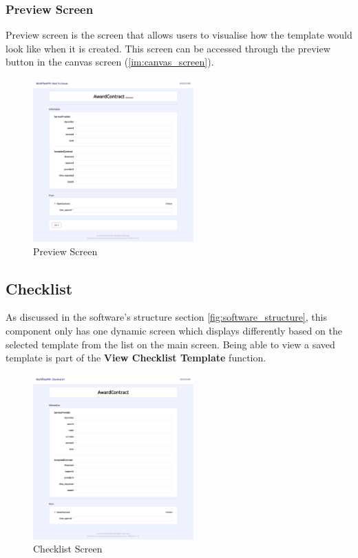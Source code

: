 \subsubsection{Preview Screen}
\label{im:preview_screen}

Preview screen is the screen that allows users to visualise how the template would look like when it is created. This screen can be accessed through the preview button in the canvas screen (\ref{im:canvas_screen}).

\begin{figure}[ht!]
    \centering
    \includegraphics[width=0.55\textwidth]{overleaf/images/screens/preview_screen.png}
    \caption{Preview Screen}
    \label{fig:preview_screen}
\end{figure}





\subsection{Checklist}
\label{im:view_checklist}

As discussed in the software's structure section \ref{fig:software_structure}, this component only has one dynamic screen which displays differently based on the selected template from the list on the main screen. Being able to view a saved template is part of the \textbf{View Checklist Template} function.

\begin{figure}[ht!]
    \centering
    \includegraphics[width=0.55\textwidth]{overleaf/images/screens/view_checklist_screen.png}
    \caption{Checklist Screen}
    \label{fig:view_checklist_screen}
\end{figure}

